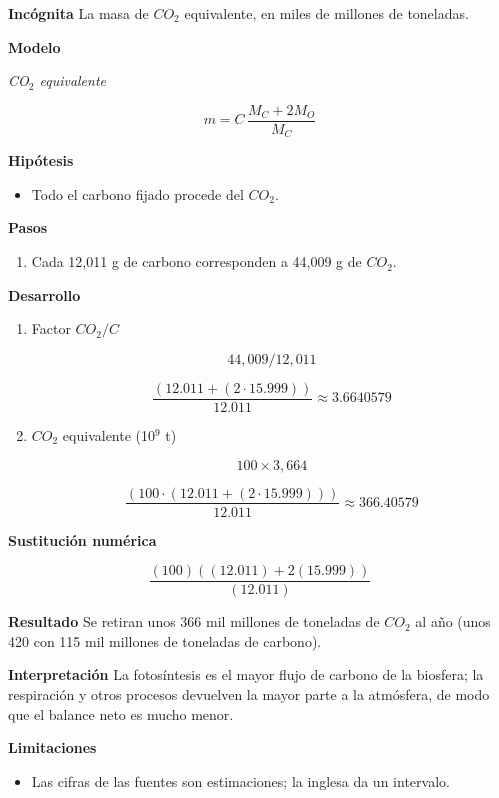 \documentclass{book}
\begin{document}
\noindent\textbf{Incógnita}
La masa de \(CO_{2}\) equivalente, en miles de millones de toneladas.


\noindent\textbf{Modelo}

\noindent\textit{CO\({}_{2}\) equivalente}

\[
m = C\,\frac{M_C + 2M_O}{M_C}
\]

\noindent\textbf{Hipótesis}
\begin{itemize}
\item Todo el carbono fijado procede del \(CO_{2}\).
\end{itemize}

\noindent\textbf{Pasos}
\begin{enumerate}
\item
Cada 12,011 g de carbono corresponden a 44,009 g de \(CO_{2}\).

\end{enumerate}

\noindent\textbf{Desarrollo}
\begin{enumerate}
\item
Factor \(CO_{2}/C\)


\[
44,009/12,011
\]

\[
\frac{\left(12.011+\left(2\cdot 15.999\right)\right)}{12.011} \approx 3.6640579
\]
\item
\(CO_{2}\) equivalente (10\({}^{9}\) t)


\[
100 \times 3,664
\]

\[
\frac{\left(100\cdot \left(12.011+\left(2\cdot 15.999\right)\right)\right)}{12.011} \approx 366.40579
\]
\end{enumerate}

\noindent\textbf{Sustitución numérica}

\[
\frac{\left(100\right) \left(\left(12.011\right) + 2 \left(15.999\right)\right)}{\left(12.011\right)}
\]

\noindent\textbf{Resultado}
Se retiran unos 366 mil millones de toneladas de \(CO_{2}\) al año (unos 420 con 115 mil millones de toneladas de carbono).


\noindent\textbf{Interpretación}
La fotosíntesis es el mayor flujo de carbono de la biosfera; la respiración y otros procesos devuelven la mayor parte a la atmósfera, de modo que el balance neto es mucho menor.


\noindent\textbf{Limitaciones}
\begin{itemize}
\item Las cifras de las fuentes son estimaciones; la inglesa da un intervalo.
\end{itemize}
\end{document}
